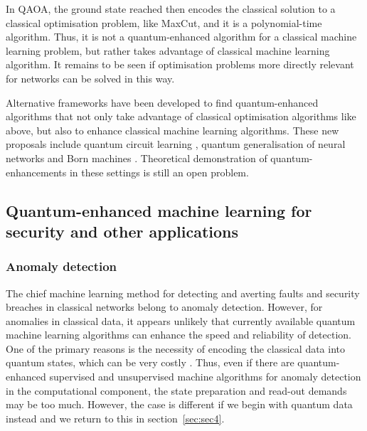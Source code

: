 \documentclass[twocolumn, aps, rmp, amsmath, amssymb, nofootinbib, superscriptaddress, longbibliography, floatfix, table-of-contents, eqsecnum]{revtex4-2}
\begin{document}
In QAOA, the ground state reached then encodes the classical solution to a classical optimisation problem, like MaxCut, and it is a polynomial-time algorithm. Thus, it is not a quantum-enhanced algorithm for a classical machine learning problem, but rather takes advantage of classical machine learning algorithm. It remains to be seen if optimisation problems more directly relevant for networks can be solved in this way.

Alternative frameworks have been developed to find quantum-enhanced algorithms that not only take advantage of classical optimisation algorithms like above, but also to enhance classical machine learning algorithms. These new proposals include quantum circuit learning \cite{mitarai2018quantum}, quantum generalisation of neural networks \cite{wan2017quantum} and Born machines \cite{cheng2018information, benedetti2018generative}. Theoretical demonstration of quantum-enhancements in these settings is still an open problem.




\subsection{Quantum-enhanced machine learning for security and other applications}

\subsubsection{Anomaly detection}

The chief machine learning method for detecting and averting faults and security breaches in classical networks belong to anomaly detection. However, for anomalies in classical data, it appears unlikely that currently available quantum machine learning algorithms can enhance the speed and reliability of detection. One of the primary reasons is the necessity of encoding the classical data into quantum states, which can be very costly \cite{aaronson2015read}. Thus, even if there are quantum-enhanced supervised and unsupervised machine algorithms for anomaly detection in the computational component, the state preparation and read-out demands may be too much. However, the case is different if we begin with quantum data instead and we return to this in section~\ref{sec:sec4}.
\end{document}
